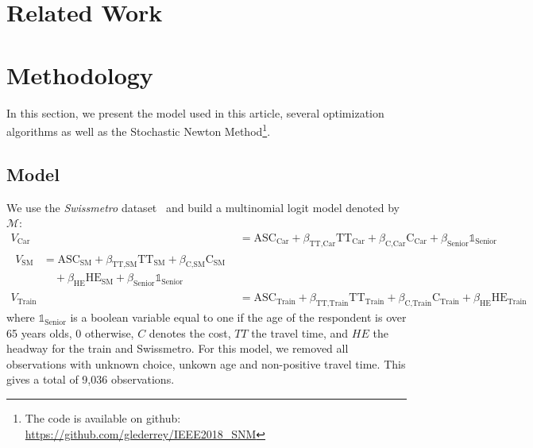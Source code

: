 \documentclass[conference]{IEEEtran}
\begin{document}
\section{Related Work}
\label{sec:rel_work}


\section{Methodology}
\label{sec:methodo}

In this section, we present the model used in this article, several optimization algorithms as well as the Stochastic Newton Method\footnote{The code is available on github: \href{https://github.com/glederrey/IEEE2018\_SNM}{https://github.com/glederrey/IEEE2018\_SNM}}.

\subsection{Model}
\label{sec:model}

We use the {\it Swissmetro} dataset~\cite{bierlaire_acceptance_2001} and build a multinomial logit model denoted by $\mathcal{M}$:
\begin{align}
\label{eq:model}
V_{\text{Car}} &= \text{ASC}_{\text{Car}} + \beta_{\text{TT,Car}} \text{TT}_{\text{Car}} + \beta_{\text{C,Car}} \text{C}_{\text{Car}} + \beta_{\text{Senior}}\mathbb{1}_{\text{Senior}} \nonumber \\
\begin{split}
V_{\text{SM}} &= \text{ASC}_{\text{SM}} + \beta_{\text{TT,SM}} \text{TT}_{\text{SM}} + \beta_{\text{C,SM}} \text{C}_{\text{SM}} \\
& \quad + \beta_{\text{HE}} \text{HE}_{\text{SM}} + \beta_{\text{Senior}}\mathbb{1}_{\text{Senior}}
\end{split} \\
V_{\text{Train}} &= \text{ASC}_{\text{Train}} + \beta_{\text{TT,Train}} \text{TT}_{\text{Train}} + \beta_{\text{C,Train}} \text{C}_{\text{Train}} + \beta_{\text{HE}} \text{HE}_{\text{Train}} \nonumber
\end{align}
where $\mathbb{1}_{\text{Senior}}$ is a boolean variable equal to one if the age of the respondent is over 65 years olds, 0 otherwise, $C$ denotes the cost, $TT$ the travel time, and $HE$ the headway for the train and Swissmetro. For this model, we removed all observations with unknown choice, unkown age and non-positive travel time. This gives a total of 9,036 observations.\\
 
\end{document}
